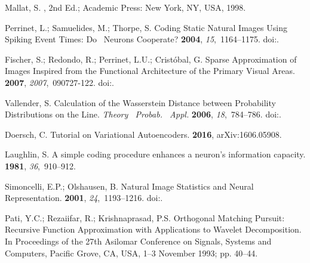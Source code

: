\documentclass[vision,article,accept,oneauthor,pdftex]{Definitions/mdpi}
\begin{document}
\begin{thebibliography}{999}
Mallat, S.
, 2nd Ed.; Academic
  Press: New York, NY, USA,  1998.

Perrinet, L.; Samuelides, M.; Thorpe, S.
\newblock Coding Static Natural Images Using Spiking Event Times: Do~ Neurons
  Cooperate?
 {\bf 2004}, {\em
  15},~1164--1175.
  doi:{\href{https://doi.org/10.1109/TNN.2004.833303}{}}.

Fischer, S.; Redondo, R.; Perrinet, L.U.; Crist{\'o}bal, G.
\newblock Sparse Approximation of Images Inspired from the Functional
  Architecture of the Primary Visual Areas.
 {\bf 2007},
  {\em 2007},~090727-122.
\newblock
  doi:{\href{https://doi.org/10.1155/2007/90727}{}}.



Vallender, S.
\newblock Calculation of the {Wasserstein} Distance between Probability
  Distributions on the Line.
\newblock \emph{Theory~ Probab.~ Appl.} \textbf{2006}, {\em 18},~784--786.
\newblock
  doi:{\href{https://doi.org/10.1137/1118101}{}}.

Doersch, C.
\newblock Tutorial on Variational Autoencoders.
 {\bf 2016}, arXiv:1606.05908.

Laughlin, S.
\newblock A simple coding procedure enhances a neuron's information capacity.
 {\bf
  1981}, {\em 36},~910--912.

Simoncelli, E.P.; Olshausen, B.
\newblock Natural Image Statistics and Neural Representation.
 {\bf 2001}, {\em 24},~1193--1216.
\newblock
  doi:{\href{https://doi.org/10.1146/annurev.neuro.24.1.1193}{}}.
  
Pati, Y.C.; Rezaiifar, R.; Krishnaprasad, P.S.
\newblock Orthogonal Matching Pursuit: Recursive Function Approximation with
  Applications to Wavelet Decomposition.
\newblock  In Proceedings of the  27th Asilomar Conference on Signals, Systems and Computers, Pacific Grove, CA, USA, 1--3 November 1993; pp. 40--44.

\end{thebibliography}
\end{document}

